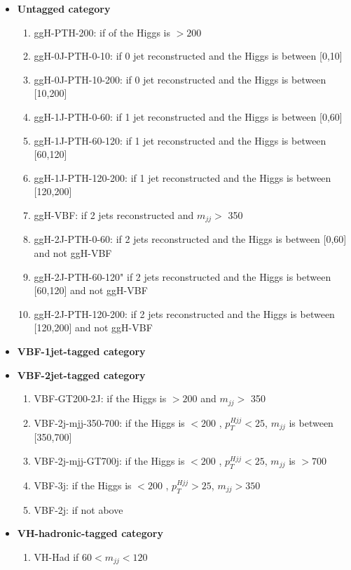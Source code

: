 \begin{itemize}
\item {\bf Untagged category}
\begin{enumerate}
\item{ggH-PTH-200}: if \pt of the Higgs is $> 200$ \GeV 
\item{ggH-0J-PTH-0-10}: if 0 jet reconstructed and the Higgs \pt is between [0,10] \GeV  
\item{ggH-0J-PTH-10-200}: if 0 jet reconstructed and the Higgs \pt is between [10,200] \GeV  
\item{ggH-1J-PTH-0-60}: if 1 jet reconstructed and the Higgs \pt is between [0,60] \GeV  
\item{ggH-1J-PTH-60-120}: if 1 jet reconstructed and the Higgs \pt is between [60,120] \GeV  
\item{ggH-1J-PTH-120-200}: if 1 jet reconstructed and the Higgs \pt is between [120,200] \GeV  
\item{ggH-VBF}: if 2 jets reconstructed and $m_{jj} >$ 350\GeV 
\item{ggH-2J-PTH-0-60}: if 2 jets reconstructed and the Higgs \pt is between [0,60] \GeV and not ggH-VBF 
\item{ggH-2J-PTH-60-120}" if 2 jets reconstructed and the Higgs \pt is between [60,120] \GeV and not ggH-VBF
\item{ggH-2J-PTH-120-200}: if 2 jets reconstructed and the Higgs \pt is between [120,200] \GeV and not ggH-VBF
\end{enumerate}
\item {\bf VBF-1jet-tagged category}
\item {\bf VBF-2jet-tagged category}
\begin{enumerate}
\item{VBF-GT200-2J}: if the Higgs \pt is $> 200$ \GeV and $m_{jj} >$ 350\GeV
\item{VBF-2j-mjj-350-700}: if the Higgs \pt is $< 200$ \GeV, $p_T^{Hjj}<25$\GeV, $m_{jj}$ is between [350,700]\GeV 
\item{VBF-2j-mjj-GT700j}: if the Higgs \pt is $< 200$ \GeV, $p_T^{Hjj}<25$\GeV, $m_{jj}$ is $>700$\GeV 
\item{VBF-3j}: if the Higgs \pt is $< 200$ \GeV, $p_T^{Hjj}>25$\GeV, $m_{jj}>350$\GeV 
\item{VBF-2j}: if not above 
\end{enumerate}
\item {\bf VH-hadronic-tagged category}
\begin{enumerate}
\item{VH-Had} if $60<m_{jj}<120$\GeV 

\end{enumerate}
\end{itemize}
